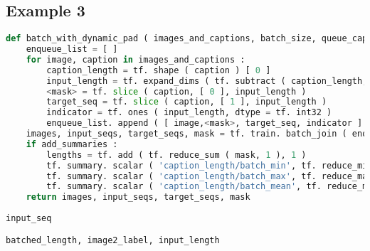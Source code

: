 \subsection{Example 3}
    \begin{lstlisting}[language=Python, caption={Input code}]
def batch_with_dynamic_pad ( images_and_captions, batch_size, queue_capacity, add_summaries = True ) : 
    enqueue_list = [ ] 
    for image, caption in images_and_captions : 
        caption_length = tf. shape ( caption ) [ 0 ] 
        input_length = tf. expand_dims ( tf. subtract ( caption_length, 1 ), 0 ) 
        <mask> = tf. slice ( caption, [ 0 ], input_length ) 
        target_seq = tf. slice ( caption, [ 1 ], input_length ) 
        indicator = tf. ones ( input_length, dtype = tf. int32 ) 
        enqueue_list. append ( [ image,<mask>, target_seq, indicator ] ) 
    images, input_seqs, target_seqs, mask = tf. train. batch_join ( enqueue_list, batch_size = batch_size, capacity = queue_capacity, dynamic_pad = True, name = 'batch_and_pad' ) 
    if add_summaries : 
        lengths = tf. add ( tf. reduce_sum ( mask, 1 ), 1 ) 
        tf. summary. scalar ( 'caption_length/batch_min', tf. reduce_min ( lengths ) ) 
        tf. summary. scalar ( 'caption_length/batch_max', tf. reduce_max ( lengths ) ) 
        tf. summary. scalar ( 'caption_length/batch_mean', tf. reduce_mean ( lengths ) ) 
    return images, input_seqs, target_seqs, mask 

    \end{lstlisting}
    \begin{lstlisting}[caption={Label}]
input_seq
    \end{lstlisting}
    \begin{lstlisting}[caption={Top 3 predictions}]
batched_length, image2_label, input_length
    \end{lstlisting}